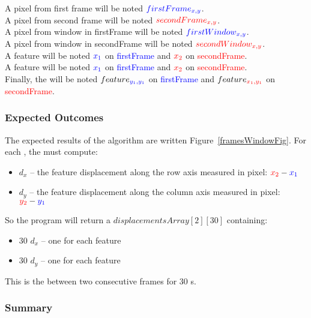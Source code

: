 A pixel from first frame will be noted $\textcolor{blue}{firstFrame_{x,y}}$.\\
A pixel from second frame will be noted $\textcolor{red}{secondFrame_{x,y}}$.\\
A pixel from window in firstFrame will be noted $\textcolor{blue}{firstWindow_{x,y}}$.\\
A pixel from window in secondFrame will be noted $\textcolor{red}{secondWindow_{x,y}}$.\\
A feature  will be noted $\textcolor{blue}{x_{1}}$ on \textcolor{blue}{firstFrame} and $\textcolor{red}{x_{2}}$ on \textcolor{red}{secondFrame}.\\
A feature  will be noted $\textcolor{blue}{x_{1}}$ on \textcolor{blue}{firstFrame} and $\textcolor{red}{x_{2}}$ on \textcolor{red}{secondFrame}.\\
Finally, the  will be noted $feature_{\textcolor{blue}{y_{1},y_{1}}}$ on \textcolor{blue}{firstFrame} and $feature_{\textcolor{red}{x_{1},y_{1}}}$ on \textcolor{red}{secondFrame}.

\subsubsection{Expected Outcomes}

The expected results of the \flow{} algorithm are written Figure~\ref{framesWindowFig}. For each \feat{}, the \vc{} must compute:
\begin{itemize}
	\item \textbf{$d_{x}$} -- the feature displacement along the row axis measured in pixel: $\textcolor{red}{x_{2}}-\textcolor{blue}{x_{1}}$
	\item \textbf{$d_{y}$} -- the feature displacement along the column axis measured in pixel: $\textcolor{red}{y_{2}}-\textcolor{blue}{y_{1}}$
\end{itemize}

So the \flow{} program will return a  $displacementsArray[2][30]$ containing:
\begin{itemize}
	\item 30 $d_{x}$  -- one for each feature
	\item 30 $d_{y}$  -- one for each feature
\end{itemize}

This is the \flow{} between two consecutive frames for 30 \feat{}s.


\subsubsection{Summary}

